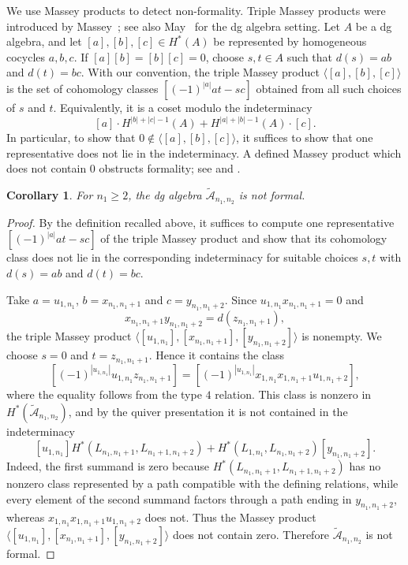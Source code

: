 \documentclass[a4paper, reqno, 11pt]{amsart}
\newtheorem{corollary}[theorem]{Corollary}
\theoremstyle{definition}
\begin{document}
We use Massey products to detect non-formality. Triple Massey products were introduced by Massey~\cite{Massey1958}; see also May~\cite{May1969} for the dg algebra setting. Let \(A\) be a dg algebra, and let \([a],[b],[c]\in H^*(A)\) be represented by homogeneous cocycles \(a,b,c\). If \([a][b]=[b][c]=0\), choose \(s,t\in A\) such that \(d(s)=ab\) and \(d(t)=bc\). With our convention, the triple Massey product \(\langle [a],[b],[c]\rangle\) is the set of cohomology classes \(\left[(-1)^{|a|}at-sc\right]\) obtained from all such choices of \(s\) and \(t\). Equivalently, it is a coset modulo the indeterminacy 
\[ [a]\cdot H^{|b|+|c|-1}(A)+H^{|a|+|b|-1}(A)\cdot[c].
\]
In particular, to show that \(0\notin \langle [a],[b],[c]\rangle\), it suffices to show that one representative does not lie in the indeterminacy. A defined Massey product which does not contain \(0\) obstructs formality; see \cite{Tralle-Oprea1997} and \cite[Theorem~2.4]{Biswas2016}.



\begin{corollary}\label{Massey product}
	For \(n_1\ge 2\), the dg algebra \(\widetilde{\mathcal A}_{n_1,n_2}\) is not formal. 
	
\end{corollary}

\begin{proof}
	By the definition recalled above, it suffices to compute one representative \(\left[(-1)^{|a|}at-sc\right]\)
	of the triple Massey product and show that its cohomology class does not lie in the corresponding indeterminacy for suitable choices \(s,t\) with \(d(s)=ab\) and \(d(t)=bc\).
	
	Take $a=u_{1,n_1}$, $b=x_{n_1,n_1+1}$ and $c=y_{n_1,n_1+2}.$ Since \(u_{1,n_1}x_{n_1,n_1+1}=0\) and \[
	x_{n_1,n_1+1}y_{n_1,n_1+2}=d(z_{n_1,n_1+1}),
	\]
	the triple Massey product $\langle [u_{1,n_1}], [x_{n_1, n_1+1}], [y_{n_1, n_1+2}] \rangle$ is nonempty. We choose $s=0$ and $t=z_{n_1,n_1+1}$. Hence it contains the class
	\[
	\left[(-1)^{|u_{1,n_1}|}u_{1,n_1}z_{n_1,n_1+1}\right]
	=
	\left[(-1)^{|u_{1,n_1}|}x_{1,n_1}x_{1,n_1+1}u_{1,n_1+2}\right],
	\]
	where the equality follows from the type \(4\) relation. This class is nonzero
	in \(H^\ast(\widetilde{\mathcal A}_{n_1,n_2})\), and by the quiver presentation
	it is not contained in the indeterminacy
	\[
	[u_{1,n_1}]H^\ast(L_{n_1,n_1+1},L_{n_1+1,n_1+2})
	+
	H^\ast(L_{1,n_1},L_{n_1,n_1+2})[y_{n_1,n_1+2}].
	\]
	Indeed, the first summand is zero because \(H^\ast(L_{n_1,n_1+1},L_{n_1+1,n_1+2})\) has no nonzero class represented by a path compatible with the defining relations, while every element of the second summand factors through a path ending in \(y_{n_1,n_1+2}\), whereas \(x_{1,n_1}x_{1,n_1+1}u_{1,n_1+2}\) does not. Thus the Massey product $\langle [u_{1,n_1}], [x_{n_1, n_1+1}], [y_{n_1, n_1+2}] \rangle$ does not contain zero. Therefore
	\(\widetilde{\mathcal A}_{n_1,n_2}\) is not formal.
\end{proof}
\end{document}
